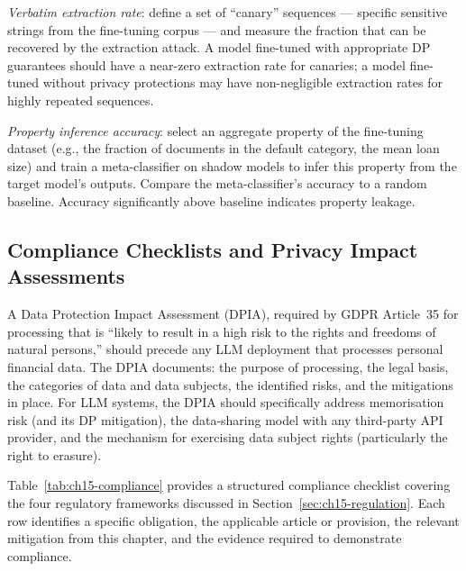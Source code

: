 \emph{Verbatim extraction rate}: define a set of ``canary'' sequences — specific sensitive strings from the fine-tuning corpus — and measure the fraction that can be recovered by the extraction attack. A model fine-tuned with appropriate DP guarantees should have a near-zero extraction rate for canaries; a model fine-tuned without privacy protections may have non-negligible extraction rates for highly repeated sequences.

\emph{Property inference accuracy}: select an aggregate property of the fine-tuning dataset (e.g., the fraction of documents in the default category, the mean loan size) and train a meta-classifier on shadow models to infer this property from the target model's outputs. Compare the meta-classifier's accuracy to a random baseline. Accuracy significantly above baseline indicates property leakage.

\subsection{Compliance Checklists and Privacy Impact Assessments}
\label{sec:ch15-compliance}

A Data Protection Impact Assessment (DPIA), required by GDPR Article~35 for processing that is ``likely to result in a high risk to the rights and freedoms of natural persons,'' should precede any LLM deployment that processes personal financial data. The DPIA documents: the purpose of processing, the legal basis, the categories of data and data subjects, the identified risks, and the mitigations in place. For LLM systems, the DPIA should specifically address memorisation risk (and its DP mitigation), the data-sharing model with any third-party API provider, and the mechanism for exercising data subject rights (particularly the right to erasure).

Table~\ref{tab:ch15-compliance} provides a structured compliance checklist covering the four regulatory frameworks discussed in Section~\ref{sec:ch15-regulation}. Each row identifies a specific obligation, the applicable article or provision, the relevant mitigation from this chapter, and the evidence required to demonstrate compliance.


